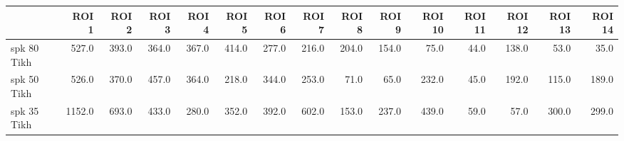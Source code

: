 \begin{tabular}{lrrrrrrrrrrrrrr}
\toprule
{} &   ROI 1 &  ROI 2 &  ROI 3 &  ROI 4 &  ROI 5 &  ROI 6 &  ROI 7 &  ROI 8 &  ROI 9 &  ROI 10 &  ROI 11 &  ROI 12 &  ROI 13 &  ROI 14 \\
\midrule
 spk 80 Tikh &   527.0 &  393.0 &  364.0 &  367.0 &  414.0 &  277.0 &  216.0 &  204.0 &  154.0 &    75.0 &    44.0 &   138.0 &    53.0 &    35.0 \\
 spk 50 Tikh &   526.0 &  370.0 &  457.0 &  364.0 &  218.0 &  344.0 &  253.0 &   71.0 &   65.0 &   232.0 &    45.0 &   192.0 &   115.0 &   189.0 \\
 spk 35 Tikh &  1152.0 &  693.0 &  433.0 &  280.0 &  352.0 &  392.0 &  602.0 &  153.0 &  237.0 &   439.0 &    59.0 &    57.0 &   300.0 &   299.0 \\
\bottomrule
\end{tabular}
